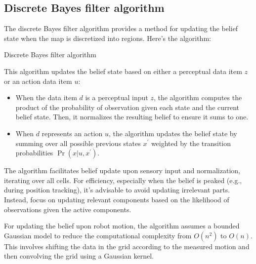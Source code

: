 \subsection{Discrete Bayes filter algorithm}
The discrete Bayes filter algorithm provides a method for updating the belief state when the map is discretized into regions. 
Here's the algorithm:
\begin{algorithm}[H]
    \caption{Discrete Bayes filter algorithm}
        \begin{algorithmic}[1]
                \EndFor
                \EndFor
                \EndFor
            \EndIf
            \State {}
        \end{algorithmic}
\end{algorithm}
This algorithm updates the belief state based on either a perceptual data item $z$ or an action data item $u$: 
\begin{itemize}
    \item When the data item $d$ is a perceptual input $z$, the algorithm computes the product of the probability of observation given each state and the current belief state. 
        Then, it normalizes the resulting belief to ensure it sums to one.
    \item When $d$ represents an action $u$, the algorithm updates the belief state by summing over all possible previous states $x^\prime$ weighted by the transition probabilities $\Pr(x|u,x^\prime)$.
\end{itemize}
The algorithm facilitates belief update upon sensory input and normalization, iterating over all cells. 
For efficiency, especially when the belief is peaked (e.g., during position tracking), it's advisable to avoid updating irrelevant parts. 
Instead, focus on updating relevant components based on the likelihood of observations given the active components.

For updating the belief upon robot motion, the algorithm assumes a bounded Gaussian model to reduce the computational complexity from $O(n^2)$ to $O(n)$. 
This involves shifting the data in the grid according to the measured motion and then convolving the grid using a Gaussian kernel.